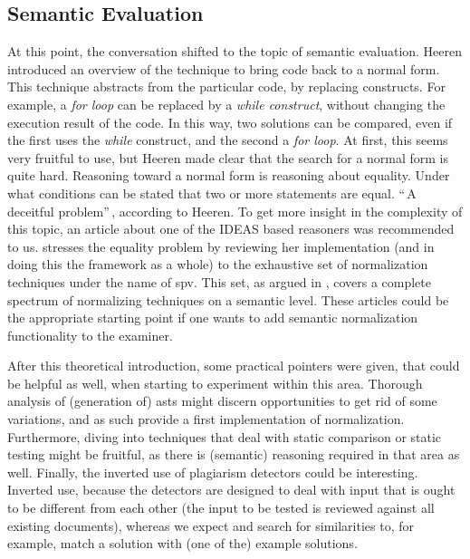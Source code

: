 \subsection{Semantic Evaluation} %
At this point, the conversation shifted to the topic of semantic evaluation.
Heeren introduced an overview of the technique to bring code back to a
normal form. This technique abstracts from the particular code, by replacing 
constructs. For example, a \emph{for loop} can be replaced by a 
\emph{while construct}, without 
changing the execution result of the code. In this way, two solutions can be
compared, even if the first uses the \emph{while} construct, and the second a 
\emph{for loop}. At first, this seems very fruitful to use, but Heeren made clear
that the search for a normal form is quite hard. Reasoning toward a normal form
is reasoning about equality. Under what conditions can be stated that two or 
more statements are equal. ``\,A deceitful problem''\,, according to Heeren. To 
get more insight in the complexity of this topic, an article about one of the
IDEAS based reasoners was recommended to us. \citep{keuning2014strategy} 
stresses the equality problem by reviewing her implementation (and in
doing this the framework as a whole) to the exhaustive set of normalization 
techniques under the name of \gls{spv}. This set, as argued in 
\citep{xu2003transformation}, covers a complete spectrum of normalizing 
techniques on a semantic level. These articles could be the appropriate 
starting point if one wants to add semantic normalization functionality 
to the \gls{examiner}.


After this theoretical introduction, some practical pointers were given, that
could be helpful as well, when starting to experiment within this area. 
Thorough analysis of (generation of) \glspl{ast} might discern opportunities 
to get rid of some variations, and as such provide a first implementation of
normalization. %
Furthermore, diving into techniques that deal with static comparison or static
testing might be fruitful, as there is (semantic) reasoning required in that
area as well. Finally, the inverted use of plagiarism detectors could be 
interesting. Inverted use, because the detectors are designed to deal with input 
that is ought to be different from each other (the input to be tested is 
reviewed against all existing documents), whereas we expect and search for 
similarities to, for example, match a solution with (one of the) example 
solutions. 


